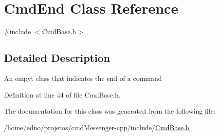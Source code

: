\hypertarget{class_cmd_end}{\section{Cmd\+End Class Reference}
\label{class_cmd_end}
}


{\ttfamily \#include $<$Cmd\+Base.\+h$>$}



\subsection{Detailed Description}
An empyt class that indicates the end of a command 

Definition at line 44 of file Cmd\+Base.\+h.



The documentation for this class was generated from the following file\+:\begin{DoxyCompactItemize}
\item 
/home/edno/projetos/cmd\+Messenger-\/cpp/include/\hyperlink{_cmd_base_8h}{Cmd\+Base.\+h}\end{DoxyCompactItemize}
